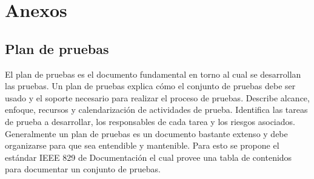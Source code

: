 \chapter{Anexos}
%
\section{Plan de pruebas}
El plan de pruebas es el documento fundamental en torno al cual se desarrollan las pruebas.
Un plan de pruebas explica cómo el conjunto de pruebas debe ser usado y el soporte necesario para realizar el proceso de pruebas. Describe alcance, enfoque, recursos y calendarización de actividades de prueba. Identifica las tareas de prueba a desarrollar, los responsables de cada tarea y los riesgos asociados. Generalmente un plan de pruebas es un documento bastante extenso y debe organizarse para que sea entendible y mantenible.
Para esto se propone el estándar IEEE 829 de Documentación el cual provee una tabla de contenidos para documentar un conjunto de pruebas.

